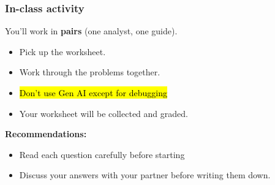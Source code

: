 \documentclass[slidestop,compress,mathserif]{beamer}
\begin{document}
\begin{frame}
\frametitle{In-class activity}

You'll work in \textbf{pairs} (one analyst, one guide).

\medskip
\begin{itemize}
\item Pick up the worksheet.
\item Work through the problems together.
\item \hl{Don't use Gen AI except for debugging}
\item Your worksheet will be collected and graded.
\end{itemize}

\medskip
\textbf{Recommendations:}
\begin{itemize}
\item Read each question carefully before starting
\item Discuss your answers with your partner before writing them down.
\end{itemize}

\end{frame}
\end{document}
